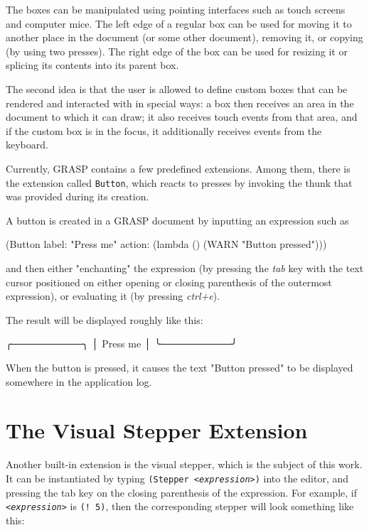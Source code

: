 \documentclass[acmsmall]{acmart}
\newenvironment{Snippet}{\Verbatim[samepage=true]}{\endVerbatim}
\begin{document}
The boxes can be manipulated using pointing interfaces such as touch
screens and computer mice. The left edge of a regular box can be used for
moving it to another place in the document (or some other document),
removing it, or copying (by using two presses). The right edge
of the box can be used for resizing it or splicing its contents
into its parent box.

The second idea is that the user is allowed to define custom boxes
that can be rendered and interacted with in special ways: a box then
receives an area in the document to which it can draw; it also
receives touch events from that area, and if the custom box is in the
focus, it additionally receives events from the keyboard.

Currently, GRASP contains a few predefined extensions. Among them,
there is the extension called \texttt{Button}, which reacts to presses by
invoking the thunk that was provided during its creation.

A button is created in a GRASP document by inputting an expression
such as

\begin{Snippet}
(Button label: "Press me" 
	action: (lambda () (WARN "Button pressed")))
\end{Snippet}

and then either "enchanting" the expression (by pressing the
\textit{tab} key with the text cursor positioned on either opening
or closing parenthesis of the outermost expression),
or evaluating it (by pressing \textit{ctrl+e}).

The result will be displayed roughly like this:

\begin{Snippet}
╭──────────╮
│ Press me │
╰──────────╯
\end{Snippet}

When the button is pressed, it causes the text "Button pressed" to be
displayed somewhere in the application log.

\section{The Visual Stepper Extension}


Another built-in extension is the visual stepper, which is the subject
of this work. It can be instantiated by typing \texttt{(Stepper
  \textit{<expression>})} into the editor, and pressing the tab key on
the closing parenthesis of the expression. For example, if
\texttt{\textit{<expression>}} is \texttt{(! 5)}, then the
corresponding stepper will look something like this:
\end{document}
